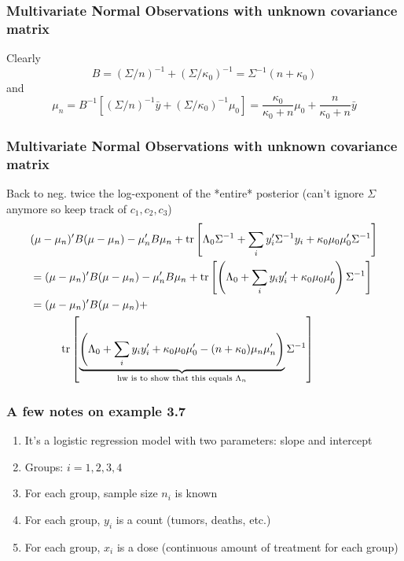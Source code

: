 \documentclass{beamer}
\begin{document}
\begin{frame}[fragile]
\frametitle{Multivariate Normal Observations with unknown covariance matrix}

Clearly 
$$
B = (\Sigma/n)^{-1} + (\Sigma/\kappa_0)^{-1} = \Sigma^{-1}(n + \kappa_0)
$$
and
$$
\mu_n = B^{-1}\left[ (\Sigma/n)^{-1}\bar{y} +  (\Sigma/\kappa_0)^{-1}\mu_0 \right] = \frac{\kappa_0 }{\kappa_0 + n }\mu_0 + \frac{n}{\kappa_0 + n}\bar{y}
$$

\end{frame}


\begin{frame}[fragile]
\frametitle{Multivariate Normal Observations with unknown covariance matrix}

Back to neg. twice the log-exponent of the *entire* posterior (can't ignore $\Sigma$ anymore so keep track of $c_1,c_2,c_3$)
\begin{align*}
&(\mu - \mu_n)'B(\mu - \mu_n) - \mu_n'B\mu_n + \text{tr}\left[\Lambda_0 \Sigma^{-1} + \sum_i y_i'\Sigma^{-1}y_i + \kappa_0 \mu_0\mu_0'\Sigma^{-1}\right]  \\
&= (\mu - \mu_n)'B(\mu - \mu_n)- \mu_n'B\mu_n + \text{tr}\left[\left( \Lambda_0  + \sum_i y_i y_i' +\kappa_0 \mu_0\mu_0'\right)\Sigma^{-1}\right]  \\
&= (\mu - \mu_n)'B(\mu - \mu_n) + \\
& \hspace{10mm} \text{tr}\left[ \underbrace{\left( \Lambda_0  + \sum_i y_i y_i' +\kappa_0 \mu_0\mu_0' - (n + \kappa_0) \mu_n \mu_n'\right)}_{ \text{hw is to show that this equals } \Lambda_n} \Sigma^{-1}\right]  
\end{align*}


\end{frame}


\begin{frame}[fragile]
\frametitle{A few notes on example 3.7}

\begin{enumerate}
\item It's a logistic regression model with two parameters: slope and intercept
\item Groups: $i=1,2,3,4$
\item For each group, sample size $n_i$ is known
\item For each group, $y_i$ is a count (tumors, deaths, etc.)
\item For each group, $x_i$ is a dose (continuous amount of treatment for each group)
\end{enumerate}

\end{frame}
\end{document}
